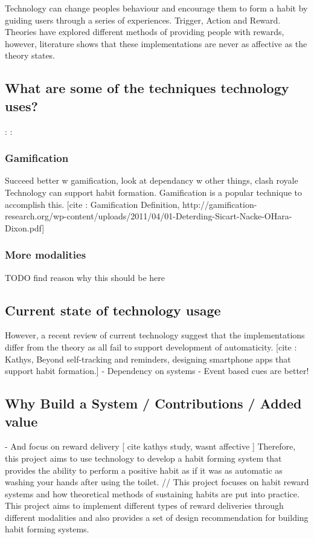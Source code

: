Technology can change peoples behaviour and encourage them to form a habit by guiding users through a series of experiences. Trigger, Action and Reward. Theories have explored different methods of providing people with rewards, however, literature shows that these implementations are never as affective as the theory states.

\subsection*{What are some of the techniques technology uses?}

:\newline
:

\subsubsection*{Gamification}
Succeed better w gamification, look at dependancy w other things, clash royale
Technology can support habit formation. Gamification is a popular technique to accomplish this. [cite : Gamification Definition, http://gamification-research.org/wp-content/uploads/2011/04/01-Deterding-Sicart-Nacke-OHara-Dixon.pdf]

\subsubsection*{More modalities}
TODO find reason why this should be here


\subsection*{Current state of technology usage}

However, a recent review of current technology suggest that the implementations differ from the theory as all fail to support development of automaticity. [cite : Kathys, Beyond self-tracking and reminders, designing smartphone apps that support habit formation.]
- Dependency on systems
- Event based cues are better!

\subsection*{Why Build a System / Contributions / Added value}

- And focus on reward delivery [ cite kathys study, wasnt affective ]
Therefore, this project aims to use technology to develop a habit forming system that provides the ability to perform a positive habit as if it was as automatic as washing your hands after using the toilet. // This project focuses on habit reward systems and how theoretical methods of sustaining habits are put into practice. This project aims to implement different types of reward deliveries through different modalities and also provides a set of design recommendation for building habit forming systems.


